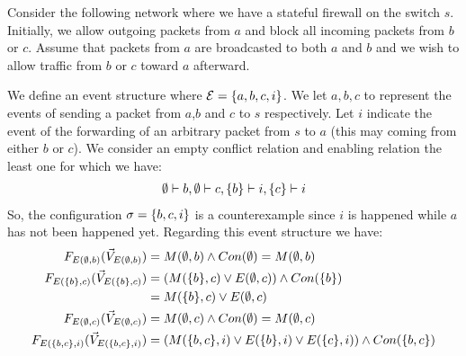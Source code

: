\begin{example}
\end{example}

\begin{example}
    Consider the following network where we have
    a stateful firewall on the switch $s$.
    Initially, we allow outgoing packets from $a$ and
    block all incoming packets from $b$ or $c$.
    Assume that packets from $a$ are broadcasted to
    both $a$ and $b$ and we wish to allow traffic
    from $b$ or $c$ toward $a$ afterward.
    \begin{center}
    \end{center}
    We define an event structure where
    $\mathcal{E} = \{a,b,c,i\}$.
    We let $a,b,c$ to represent the events of sending
    a packet from $a$,$b$ and $c$ to $s$ respectively.
    Let $i$ indicate the event of the forwarding of
    an arbitrary packet from $s$ to $a$ (this may coming
    from either $b$ or $c$).
    We consider an empty conflict relation and enabling
    relation the least one for which we have:
    \begin{align*}
        \emptyset \vdash b, \emptyset \vdash c,
        \{b\} \vdash i, \{c\} \vdash i
    \end{align*}
    So, the configuration $\sigma = \{b,c,i\}$ is a
    counterexample since $i$ is happened while $a$
    has not been happened yet.
    Regarding this event structure we have:
    \begin{align*}
        \f{E(\e,b)}      & = M(\e,b) \wedge Con(\e) = M(\e,b)                                   \\
        \f{E(\s{b},c)}   & = (M(\s{b},c) \vee E(\e,c)) \wedge Con(\s{b})                        \\
                         & = M(\s{b},c) \vee E(\e,c)                                            \\
        \f{E(\e,c)}      & = M(\e,c) \wedge Con(\e)  = M(\e,c)                                  \\
        \f{E(\s{b,c},i)} & = (M(\s{b,c},i) \vee E(\s{b},i) \vee E(\s{c},i))
        \wedge Con(\s{b,c})                                                                     \\

\end{align*}
\end{example}
